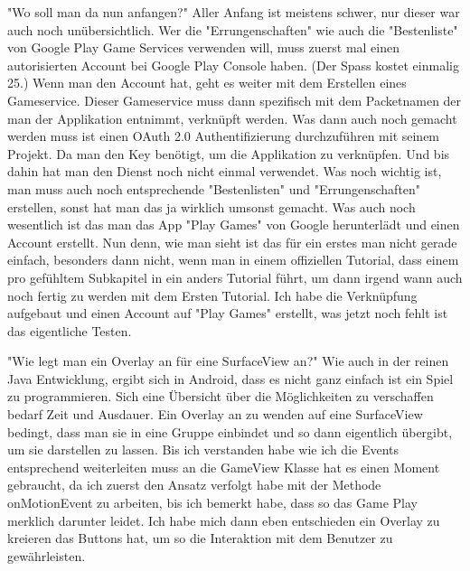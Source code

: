 \label{googlePlayGame}
"Wo soll man da nun anfangen?"\newline\newline
Aller Anfang ist meistens schwer, nur dieser war auch noch unübersichtlich.
Wer die "Errungenschaften" wie auch die "Bestenliste" von Google Play Game Services verwenden will,
muss zuerst mal einen autorisierten Account bei Google Play Console haben. (Der Spass kostet einmalig 25\textdollar.)
Wenn man den Account hat, geht es weiter mit dem Erstellen eines Gameservice.
Dieser Gameservice muss dann spezifisch mit dem Packetnamen der man der Applikation entnimmt, verknüpft werden.
Was dann auch noch gemacht werden muss ist einen OAuth 2.0 Authentifizierung
durchzuführen mit seinem Projekt. Da man den Key benötigt, um die Applikation zu verknüpfen.
Und bis dahin hat man den Dienst noch nicht einmal verwendet. Was noch wichtig ist,
man muss auch noch entsprechende "Bestenlisten" und "Errungenschaften" erstellen,
sonst hat man das ja wirklich umsonst gemacht. Was auch noch wesentlich ist das man das App "Play Games"
von Google herunterlädt und einen Account erstellt.\newline\newline
Nun denn, wie man sieht ist das für ein erstes man nicht gerade einfach, besonders
dann nicht, wenn man in einem offiziellen Tutorial, dass einem pro gefühltem
Subkapitel in ein anders Tutorial führt, um dann irgend wann auch noch fertig zu werden mit dem Ersten Tutorial.
Ich habe die Verknüpfung aufgebaut und einen Account auf "Play Games" erstellt,
was jetzt noch fehlt ist das eigentliche Testen.

\label{game-overlay}
"Wie legt man ein Overlay an für eine SurfaceView an?"\newline\newline
Wie auch in der reinen Java Entwicklung, ergibt sich in Android, dass es nicht ganz einfach
ist ein Spiel zu programmieren. Sich eine Übersicht über die Möglichkeiten zu verschaffen bedarf
Zeit und Ausdauer. Ein Overlay an zu wenden auf eine SurfaceView bedingt, dass man sie in eine
Gruppe einbindet und so dann eigentlich übergibt, um sie darstellen zu lassen. Bis ich verstanden
habe wie ich die Events entsprechend weiterleiten muss an die GameView Klasse hat es einen Moment
gebraucht, da ich zuerst den Ansatz verfolgt habe mit der Methode onMotionEvent zu arbeiten,
bis ich bemerkt habe, dass so das Game Play merklich darunter leidet. Ich habe mich dann eben
entschieden ein Overlay zu kreieren das Buttons hat, um so die Interaktion mit dem Benutzer zu
gewährleisten.

